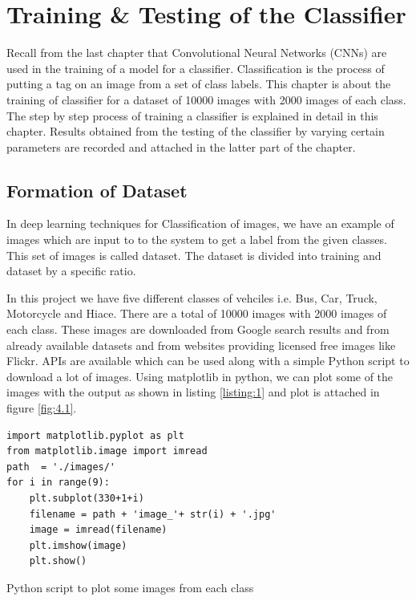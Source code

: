 \chapter{Training \& Testing of the
Classifier}
\label{Chapter 4}
Recall from the last chapter that Convolutional Neural Networks (CNNs) are used
in the training of a model for a classifier. Classification is the process
of putting a tag on an image from a set of class labels. This chapter is about the
training of classifier for a dataset of 10000 images with 2000 images of each class.
The step by step process of training a classifier is explained in detail in this chapter. Results obtained from the testing of the classifier by varying certain parameters are recorded and attached
in the latter part of the chapter.
\section{Formation of Dataset}
In deep learning techniques for Classification of images, we have
an example of images which are input to to the system to get a
label from the given classes. This set of images is called dataset.
The dataset is divided into training and dataset by a specific ratio.


In this project we have five different classes of vehciles i.e. Bus, Car, Truck, Motorcycle
and Hiace. There are a total of 10000 images with 2000 images of each 
class. These images are downloaded from Google search results and from already available
datasets and from websites providing licensed free images like Flickr. APIs are available which
can be used along with a simple Python script to download a lot of images.
Using matplotlib in python, we can plot some of the images with the output as
shown in listing \ref{listing:1} and plot is attached in figure
\ref{fig:4.1}.
\begin{listing}[H]
\begin{verbatim}
import matplotlib.pyplot as plt
from matplotlib.image import imread  
path  = './images/'
for i in range(9):
    plt.subplot(330+1+i)
    filename = path + 'image_'+ str(i) + '.jpg'
    image = imread(filename)
    plt.imshow(image)    
    plt.show()
\end{verbatim}
\caption{Python script to plot some images from each class}
\label{listing:1}
\end{listing}

